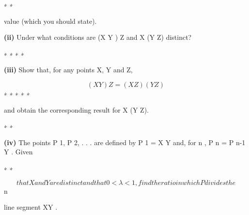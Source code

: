 \documentclass[12pt]{article}
\begin{document}
\begin{flushleft}
∗ ∗\par
value (which you should state).\par
\textbf{(ii)} Under what conditions are (X Y ) Z and X (Y Z) distinct?\par
∗ ∗ ∗ ∗\par
\textbf{(iii)} Show that, for any points X, Y and Z,\par
\[(X Y ) Z = (X Z) (Y Z)\]
∗ ∗ ∗ ∗ ∗\par
and obtain the corresponding result for X (Y Z).\par
∗ ∗\par
\textbf{(iv)} The points P 1, P 2, . . . are defined by P 1 = X Y and, for n , P n = P n-1 Y . Given\par
∗ ∗\par
\[that X and Y are distinct and that 0 < λ < 1, find the ratio in which P divides the\]
n\par
line segment XY .\par
\end{flushleft}
\end{document}
